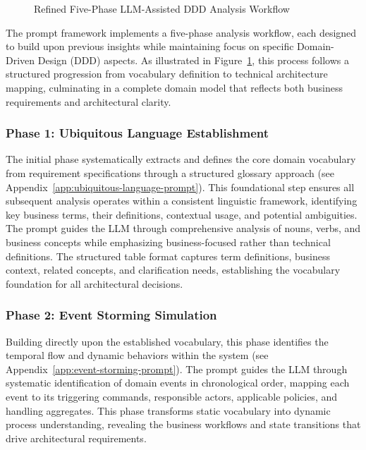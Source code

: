 \begin{figure}[htbp]
    \caption{Refined Five-Phase LLM-Assisted DDD Analysis Workflow}
    \label{fig:refined-ddd-workflow}
    \end{figure}

The prompt framework implements a five-phase analysis workflow, each designed to build upon previous insights while maintaining focus on specific Domain-Driven Design (DDD) aspects. As illustrated in Figure~\ref{fig:refined-ddd-workflow}, this process follows a structured progression from vocabulary definition to technical architecture mapping, culminating in a complete domain model that reflects both business requirements and architectural clarity.

\subsubsection{Phase 1: Ubiquitous Language Establishment}
The initial phase systematically extracts and defines the core domain vocabulary from requirement specifications through a structured glossary approach (see Appendix~\ref{app:ubiquitous-language-prompt}). This foundational step ensures all subsequent analysis operates within a consistent linguistic framework, identifying key business terms, their definitions, contextual usage, and potential ambiguities. The prompt guides the LLM through comprehensive analysis of nouns, verbs, and business concepts while emphasizing business-focused rather than technical definitions. The structured table format captures term definitions, business context, related concepts, and clarification needs, establishing the vocabulary foundation for all architectural decisions.

\subsubsection{Phase 2: Event Storming Simulation}
Building directly upon the established vocabulary, this phase identifies the temporal flow and dynamic behaviors within the system (see Appendix~\ref{app:event-storming-prompt}). The prompt guides the LLM through systematic identification of domain events in chronological order, mapping each event to its triggering commands, responsible actors, applicable policies, and handling aggregates. This phase transforms static vocabulary into dynamic process understanding, revealing the business workflows and state transitions that drive architectural requirements.


